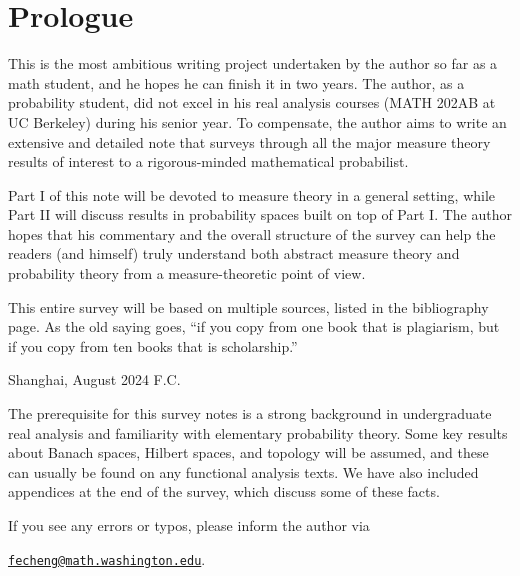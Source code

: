 \chapter*{\Large Prologue}

This is the most ambitious writing project undertaken by the author so far as a math student, and he hopes he can finish it in two years. The author, as a probability student, did not excel in his real analysis courses (MATH 202AB at UC Berkeley) during his senior year. To compensate, the author aims to write an extensive and detailed note that surveys through all the major measure theory results of interest to a rigorous-minded mathematical probabilist.

Part I of this note will be devoted to measure theory in a general setting, while Part II will discuss results in probability spaces built on top of Part I. The author hopes that his commentary and the overall structure of the survey can help the readers (and himself) truly understand both abstract measure theory and probability theory from a measure-theoretic point of view.

This entire survey will be based on multiple sources, listed in the bibliography page. As the old saying goes, ``if you copy from one book that is plagiarism, but if you copy from ten books that is scholarship.''
\vspace{1\baselineskip}

\noindent Shanghai, August 2024 \hfill F.C.

\vspace{3\baselineskip}
The prerequisite for this survey notes is a strong background in undergraduate real analysis and familiarity with elementary probability theory. Some key results about Banach spaces, Hilbert spaces, and topology will be assumed, and these can usually be found on any functional analysis texts. We have also included appendices at the end of the survey, which discuss some of these facts.

If you see any errors or typos, please inform the author via \begin{center}
    \href{mailto:fecheng@uw.edu}{\texttt{fecheng@math.washington.edu}}.
\end{center}